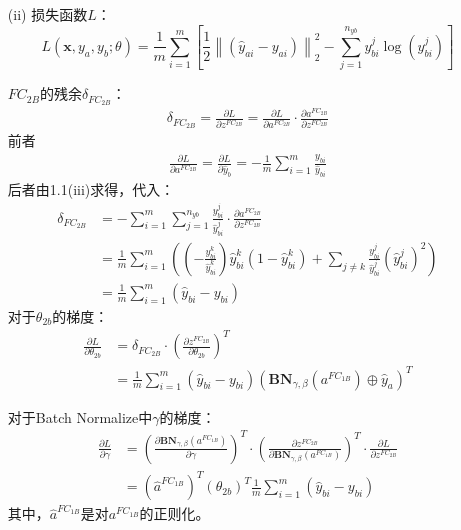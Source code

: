 \begin{solution}
\begin{enumerate}
        
        \item[(ii)] 损失函数$L$：
        $$L\left(\boldsymbol{x}, y_{a}, y_{b} ; \theta\right)=\frac{1}{m} \sum_{i=1}^{m}\left[\frac{1}{2}\left\|\left(\widehat{y}_{a i}-y_{a i}\right)\right\|_{2}^{2}-\sum_{j=1}^{n_{y b}} y_{b i}^{j} \log \left(\widehat{y}_{b i}^{j}\right)\right]$$

        $FC_{2B}$的残余$\delta_{FC_{2B}}$：
        \begin{align*}
            \delta_{FC_{2B}} = \frac{\partial L}{\partial z^{FC_{2B}}} = \frac{\partial L}{\partial a^{FC_{2B}}}\cdot\frac{\partial a^{FC_{2B}}}{\partial z^{FC_{2B}}}
        \end{align*}
        前者
        \begin{align*}
            \frac{\partial L}{\partial a^{FC_{2B}}}=\frac{\partial L}{\partial \hat{y}_b} = -\frac{1}{m}\sum_{i=1}^{m} \frac{y_{bi}}{\hat{y}_{bi}}
        \end{align*}
        后者由1.1(iii)求得，代入：
        \begin{align*}
            \delta_{FC_{2B}} &= -\sum_{i=1}^{m} \sum_{j=1}^{n_{yb}}\frac{y_{bi}^j}{\hat{y}_{bi}^j}\cdot\frac{\partial a^{FC_{2B}}}{\partial z^{FC_{2B}}}\\
            &= \frac{1}{m}\sum_{i=1}^{m}\left((-\frac{y_{bi}^k}{\hat{y}_{bi}^k})\hat{y}_{bi}^k(1-\hat{y}_{bi}^k)+\sum_{j\neq k}\frac{y_{bi}^j}{\hat{y}_{bi}^j}\left(\hat{y}_{bi}^j\right)^2\right)\\
            &= \frac{1}{m}\sum_{i=1}^{m}\left(\hat{y}_{bi}-y_{bi}\right)
        \end{align*}
        对于$\theta_{2b}$的梯度：
        \begin{align*}
            \frac{\partial L}{\partial \theta_{2b}} &= \delta_{FC_{2B}} \cdot \left(\frac{\partial z^{FC_{2B}}}{\partial \theta_{2b}}\right)^T \\
            &=\frac{1}{m}\sum_{i=1}^{m}\left(\hat{y}_{bi}-y_{bi}\right)\left(\textbf{BN}_{\gamma,\beta}(a^{FC_{1B}})\oplus\hat{y}_a\right)^T
        \end{align*}

        对于Batch Normalize中$\gamma$的梯度：
        \begin{align*}
            \frac{\partial L}{\partial\gamma} &= \left(\frac{\partial \textbf{BN}_{\gamma,\beta}(a^{FC_{1B}})}{\partial \gamma}\right)^T \cdot \left(\frac{\partial z^{FC_{2B}}}{\partial\textbf{BN}_{\gamma,\beta}(a^{FC_{1B}})}\right)^T \cdot\frac{\partial L}{\partial z^{FC_{2B}}}\\
            &= \left(\hat{a}^{FC_{1B}}\right)^T\left(\theta_{2b}\right)^T\frac{1}{m}\sum_{i=1}^{m}\left(\hat{y}_{bi}-y_{bi}\right)
        \end{align*}
        其中，$\hat{a}^{FC_{1B}}$是对$a^{FC_{1B}}$的正则化。


\end{enumerate}
\end{solution}
